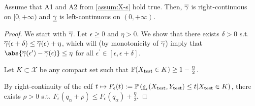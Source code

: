 \begin{proposition}
\label{prop:continuityGamma}
    Assume that A1 and A2 from \ref{assum:X-s} hold true. Then, $\overline{\gamma}$ is right-continuous on $[0,+\infty)$ and $\underline{\gamma}$ is left-continuous on $(0,+\infty)$.
\end{proposition}
\begin{proof}
    We start with $\overline{\gamma}$. Let $\epsilon\geq 0$ and $\eta>0$. We show that there exists $\delta>0$ s.t. $\overline{\gamma}(\epsilon+\delta)\leq\overline{\gamma}(\epsilon)+\eta$, which will (by monotonicity of $\overline{\gamma}$) imply that $\abs{\covmax(\epsilon^\prime)-\covmax(\epsilon)}\leq \eta$ for all $\epsilon^\prime\in[\epsilon, \epsilon+\delta]$.

    Let $K\subset \mathcal{X}$ be any compact set such that $\mathbb{P}(X_\mathrm{test} \in K) \geq 1 - \frac{\eta}{2}$.

    By right-continuity of the cdf $t\mapsto F_\epsilon(t):=\mathbb{P}\left(\underline{s}_{\epsilon}(X_\mathrm{test}, Y_\mathrm{test})\leq t | X_\mathrm{test} \in K \right)$, there exists $\rho>0$ s.t. $F_\epsilon (q_\alpha + \rho) \leq F_\epsilon(q_\alpha) + \frac{\eta}{2}$.


\end{proof}
